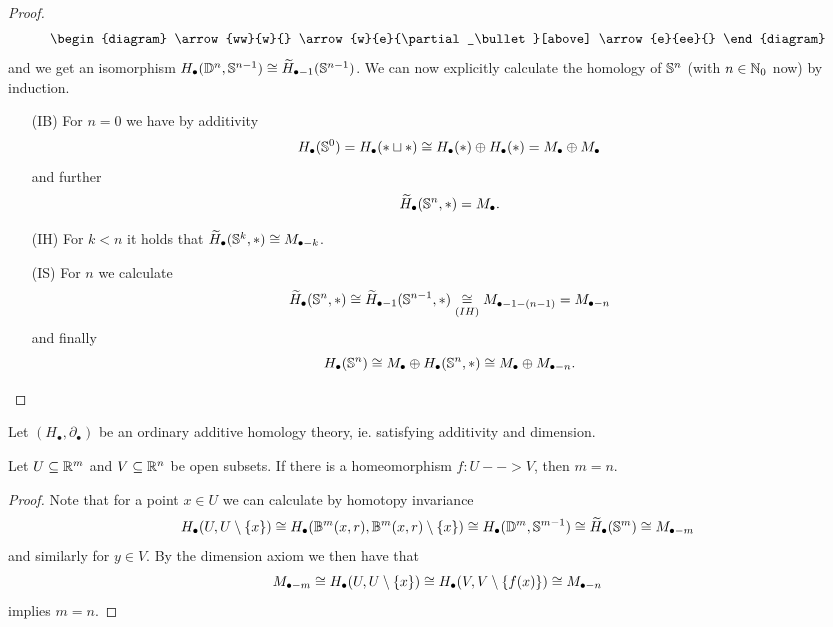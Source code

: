 \begin{proof}
\begin{equation*}
\begin{diagram}
				\arrow{ww}{w}{}
				\arrow{w}{e}{\partial_\bullet}[above]
				\arrow{e}{ee}{}
			\end{diagram}
		\end{equation*}
		and we get an isomorphism $H_\bullet(\D^n,\S^{n-1}) \isom \widetilde{H}_{\bullet-1}(\S^{n-1})$. We can now explicitly calculate the homology of $\S^n$ (with $n \in \N_0$ now) by induction.
		\begin{enumerate}
			\item[(IB)]{
				For $n=0$ we have by additivity
				\begin{equation*}
					H_\bullet(\S^0) = H_\bullet(* \sqcup *) \isom H_\bullet(*) \oplus H_\bullet(*) = M_\bullet \oplus M_\bullet
				\end{equation*}
				and further 
				\begin{equation*}
					\widetilde{H}_\bullet(\S^n,*) = M_\bullet.
				\end{equation*}
			}
			\item[(IH)]{
				For $k<n$ it holds that $\widetilde{H}_\bullet(\S^k,*) \isom M_{\bullet-k}$.
			}
			\item[(IS)]{
				For $n$ we calculate
				\begin{equation*}
					\widetilde{H}_\bullet(\S^n,*) \isom \widetilde{H}_{\bullet-1}(\S^{n-1},*) \underset{(IH)}{\isom} M_{\bullet-1-(n-1)} = M_{\bullet-n}
				\end{equation*}
				and finally
				\begin{equation*}
					H_\bullet(\S^n) \isom M_\bullet \oplus H_\bullet(\S^n,*) \isom M_\bullet \oplus M_{\bullet-n}.
				\end{equation*}
			}\vspace{-3.5em}
		\end{enumerate}
	\end{proof}

	\begin{theorem}
		Let $(H_\bullet, \partial_\bullet)$ be an ordinary additive homology theory, ie. satisfying additivity and dimension.

		Let $U \subseteq \R^m$ and $V \subseteq \R^n$ be open subsets. If there is a homeomorphism $f:U-->V$, then $m = n$.
	\end{theorem}
	\begin{proof}
		Note that for a point $x \in U$ we can calculate by homotopy invariance
		\begin{equation*}
			H_\bullet(U,U\setminus\{x\}) \isom H_\bullet(\B^m(x,r),\B^m(x,r)\setminus\{x\}) \isom H_\bullet(\D^m,\S^{m-1}) \isom \widetilde{H}_\bullet(\S^m) \isom M_{\bullet-m}
		\end{equation*}
		and similarly for $y \in V$. By the dimension axiom we then have that 
		\begin{equation*}
			M_{\bullet-m} \isom H_\bullet(U,U\setminus\{x\}) \isom H_\bullet(V,V\setminus\{f(x)\}) \isom M_{\bullet-n}
		\end{equation*}
		implies $m=n$.
	\end{proof}


